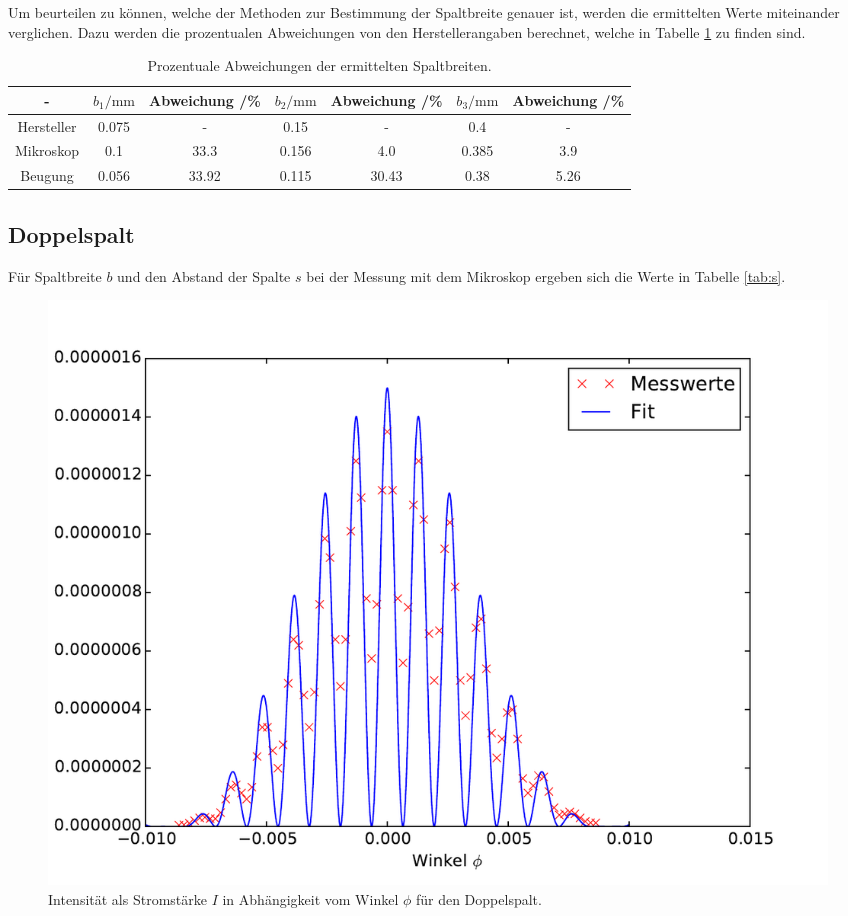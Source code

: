Um beurteilen zu können, welche der Methoden zur Bestimmung der Spaltbreite genauer ist, werden die ermittelten Werte miteinander verglichen. Dazu werden die prozentualen Abweichungen von den Herstellerangaben berechnet, welche in Tabelle \ref{tab:abweichungen} zu finden sind.

\begin{table}
  \caption{Prozentuale Abweichungen der ermittelten Spaltbreiten.}
  \centering
  \label{tab:abweichungen}
  \begin{tabular}{c c c c c c c}
    \toprule
   - & $b_1/\si{\milli\meter}$ & Abweichung /\% & $b_2/\si{\milli\meter}$ & Abweichung /\% & $b_3/\si{\milli\meter}$ & Abweichung /\%\\
   \midrule
Hersteller & 0.075 & - & 0.15 & - & 0.4 & -  \\
Mikroskop & 0.1 & 33.3 & 0.156 & 4.0 & 0.385 & 3.9\\
Beugung & 0.056 & 33.92 & 0.115 & 30.43 &  0.38 & 5.26 \\
  \bottomrule
  \end{tabular}
  \end{table}

  \subsection{Doppelspalt}
  Für Spaltbreite $b$ und den Abstand der Spalte $s$ bei der Messung mit dem Mikroskop ergeben sich die Werte in Tabelle \ref{tab:s}.

\begin{figure}
  \centering
  \includegraphics[scale=0.6]{auswertung/doppel.pdf}
  \caption{Intensität als Stromstärke $I$ in Abhängigkeit vom Winkel $\phi$ für den Doppelspalt.}
  \label{fig:doppel}
\end{figure}

